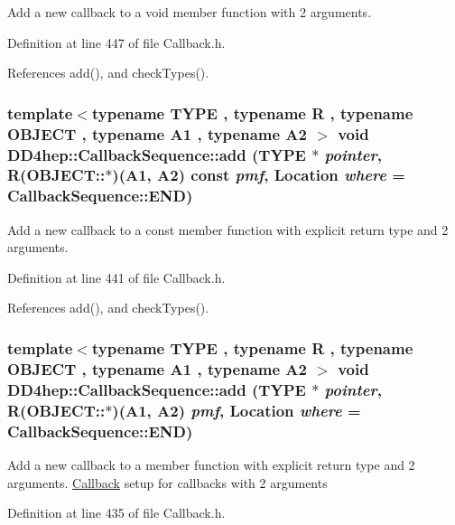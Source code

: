 Add a new callback to a void member function with 2 arguments. 

Definition at line 447 of file Callback.h.

References add(), and checkTypes().\hypertarget{struct_d_d4hep_1_1_callback_sequence_a176f9409cc71b2811746680da84989ce}{
\subsubsection[{add}]{\setlength{\rightskip}{0pt plus 5cm}template$<$typename TYPE , typename R , typename OBJECT , typename A1 , typename A2 $>$ void DD4hep::CallbackSequence::add (TYPE $\ast$ {\em pointer}, \/  R(OBJECT::$\ast$)(A1, A2) const  {\em pmf}, \/  {\bf Location} {\em where} = {\ttfamily CallbackSequence::END})}}
\label{struct_d_d4hep_1_1_callback_sequence_a176f9409cc71b2811746680da84989ce}


Add a new callback to a const member function with explicit return type and 2 arguments. 

Definition at line 441 of file Callback.h.

References add(), and checkTypes().\hypertarget{struct_d_d4hep_1_1_callback_sequence_ad73a7b5a1c07c298dbbc62730b945c93}{
\subsubsection[{add}]{\setlength{\rightskip}{0pt plus 5cm}template$<$typename TYPE , typename R , typename OBJECT , typename A1 , typename A2 $>$ void DD4hep::CallbackSequence::add (TYPE $\ast$ {\em pointer}, \/  R(OBJECT::$\ast$)(A1, A2) {\em pmf}, \/  {\bf Location} {\em where} = {\ttfamily CallbackSequence::END})}}
\label{struct_d_d4hep_1_1_callback_sequence_ad73a7b5a1c07c298dbbc62730b945c93}


Add a new callback to a member function with explicit return type and 2 arguments. \hyperlink{class_d_d4hep_1_1_callback}{Callback} setup for callbacks with 2 arguments 

Definition at line 435 of file Callback.h.


